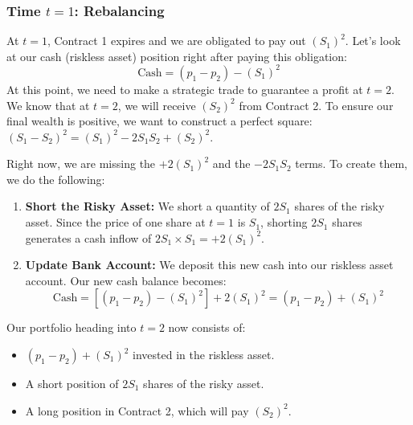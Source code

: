 \subsubsection*{Time $t=1$: Rebalancing}
At $t=1$, Contract 1 expires and we are obligated to pay out $(S_1)^2$. 
Let's look at our cash (riskless asset) position right after paying this obligation:
\begin{equation}
    \text{Cash} = (p_1 - p_2) - (S_1)^2
\end{equation}
At this point, we need to make a strategic trade to guarantee a profit at $t=2$. We know that at $t=2$, we will receive $(S_2)^2$ from Contract 2. To ensure our final wealth is positive, we want to construct a perfect square: $(S_1 - S_2)^2 = (S_1)^2 - 2S_1S_2 + (S_2)^2$. 

Right now, we are missing the $+2(S_1)^2$ and the $-2S_1S_2$ terms. To create them, we do the following:
\begin{enumerate}
    \item \textbf{Short the Risky Asset:} We short a quantity of $2S_1$ shares of the risky asset. Since the price of one share at $t=1$ is $S_1$, shorting $2S_1$ shares generates a cash inflow of $2S_1 \times S_1 = +2(S_1)^2$.
    \item \textbf{Update Bank Account:} We deposit this new cash into our riskless asset account. Our new cash balance becomes:
    \begin{equation}
        \text{Cash} = [(p_1 - p_2) - (S_1)^2] + 2(S_1)^2 = (p_1 - p_2) + (S_1)^2
    \end{equation}
\end{enumerate}
Our portfolio heading into $t=2$ now consists of:
\begin{itemize}
    \item $(p_1 - p_2) + (S_1)^2$ invested in the riskless asset.
    \item A short position of $2S_1$ shares of the risky asset.
    \item A long position in Contract 2, which will pay $(S_2)^2$.
\end{itemize}

